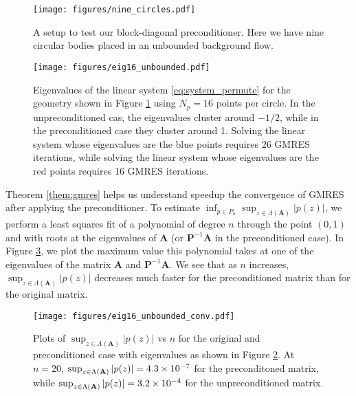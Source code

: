 \begin{figure}[!h]
\begin{center}
\texttt{[image: figures/nine\_circles.pdf]}
\end{center}
\caption[Test setup for preconditioner]{A setup to test our block-diagonal preconditioner. Here we have nine circular bodies placed in an unbounded background flow.}\label{fig:nine_circles}
\end{figure}

\begin{figure}[!h]
\begin{center}
\texttt{[image: figures/eig16\_unbounded.pdf]}
\end{center}
\caption[Eigenvalues of preconditioned and unpreconditioned linear system]{Eigenvalues of the linear system \eqref{eq:system_permute} for the geometry shown in Figure \ref{fig:nine_circles} using $N_p =16$ points per circle. In the unpreconditioned cas,  the eigenvalues cluster around $-1/2$, while in the preconditioned case they cluster around 1. Solving the linear system whose eigenvalues are the blue points requires 26 GMRES iterations, while solving the linear system whose eigenvalues are the red points requires 16 GMRES iterations.}\label{fig:eigenvalues_circles}
\end{figure}

Theorem \ref{them:gmres} helps us understand speedup the convergence of GMRES after applying the preconditioner. To estimate $\inf_{p\in P_n}\sup_{z\in \Lambda(\mathbf{A})} |p(z)|$, we perform a least squares fit of a polynomial of degree $n$ through the point $(0,1)$ and with roots at the eigenvalues of $\mathbf{A}$ (or $\mathbf{P}^{-1}\mathbf{A}$ in the preconditioned case).  In Figure \ref{fig:eigenvalues_polynomial}, we plot the maximum value this polynomial takes at one of the eigenvalues of the matrix $\mathbf{A}$ and $\mathbf{P}^{-1}\mathbf{A}$. We see that as $n$ increases, $\sup_{z\in \Lambda(\mathbf{A})} |p(z)|$ decreases much faster for the preconditioned matrix than for the original matrix. 


\begin{figure}[!h]
\begin{center}
\texttt{[image: figures/eig16\_unbounded\_conv.pdf]}
\end{center}
\caption[Values of $\sup_{z\in \Lambda(\mathbf{A})} |p(z)|$ vs $n$ ]{Plots of $\sup_{z\in \Lambda(\mathbf{A})} |p(z)|$ vs $n$ for the original and preconditioned case with eigenvalues as shown in Figure \ref{fig:eigenvalues_circles}. At $n=20$,  $\sup_{z\in \Lambda(\mathbf{A})} |p(z)| = 4.3\times 10^{-7}$ for the preconditoned matrix, while $\sup_{z\in \Lambda(\mathbf{A})} |p(z)| =3.2\times 10^{-4}$ for the unpreconditioned matrix.   }\label{fig:eigenvalues_polynomial}
\end{figure}

